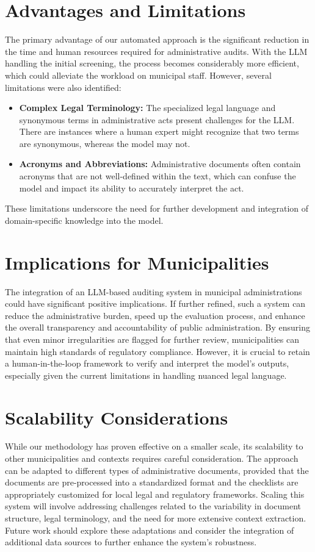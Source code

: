 \documentclass[../main.tex]{subfiles}
\begin{document}
\section*{Advantages and Limitations}
The primary advantage of our automated approach is the significant reduction in the time and human resources required for administrative audits. With the LLM handling the initial screening, the process becomes considerably more efficient, which could alleviate the workload on municipal staff. However, several limitations were also identified:
\begin{itemize}
    \item \textbf{Complex Legal Terminology:} The specialized legal language and synonymous terms in administrative acts present challenges for the LLM. There are instances where a human expert might recognize that two terms are synonymous, whereas the model may not.
    \item \textbf{Acronyms and Abbreviations:} Administrative documents often contain acronyms that are not well-defined within the text, which can confuse the model and impact its ability to accurately interpret the act.
\end{itemize}
These limitations underscore the need for further development and integration of domain-specific knowledge into the model.

\section*{Implications for Municipalities}
The integration of an LLM-based auditing system in municipal administrations could have significant positive implications. If further refined, such a system can reduce the administrative burden, speed up the evaluation process, and enhance the overall transparency and accountability of public administration. By ensuring that even minor irregularities are flagged for further review, municipalities can maintain high standards of regulatory compliance. However, it is crucial to retain a human-in-the-loop framework to verify and interpret the model's outputs, especially given the current limitations in handling nuanced legal language.

\section*{Scalability Considerations}
While our methodology has proven effective on a smaller scale, its scalability to other municipalities and contexts requires careful consideration. The approach can be adapted to different types of administrative documents, provided that the documents are pre-processed into a standardized format and the checklists are appropriately customized for local legal and regulatory frameworks. Scaling this system will involve addressing challenges related to the variability in document structure, legal terminology, and the need for more extensive context extraction. Future work should explore these adaptations and consider the integration of additional data sources to further enhance the system's robustness.
\end{document}
